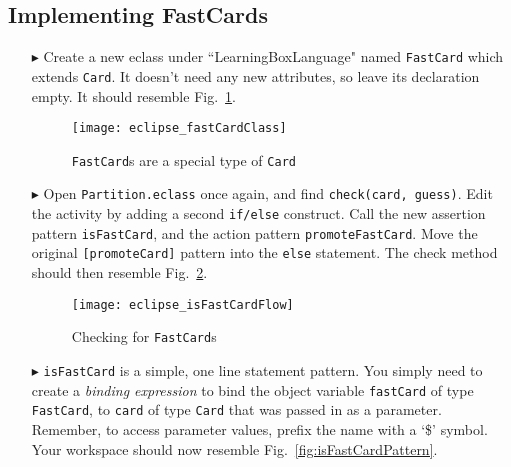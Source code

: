 \newpage
\subsection{Implementing FastCards}
\texHeader
\hypertarget{fastCard tex}{}

\begin{itemize}
  
\item[$\blacktriangleright$] Create a new eclass under ``LearningBoxLanguage" named
\texttt{FastCard} which extends \texttt{Card}. It doesn't need any new attributes, so leave its declaration empty. It should resemble Fig.~\ref{fig:fastClass}.

\vspace{0.5cm}

\begin{figure}[htp]
\begin{center}
  \texttt{[image: eclipse\_fastCardClass]}
  \caption{\texttt{FastCard}s are a special type of \texttt{Card}}
  \label{fig:fastClass}
\end{center}
\end{figure}

\item[$\blacktriangleright$] Open \texttt{Partition.eclass} once again, and find \texttt{check(card, guess)}. Edit the activity by adding a second
\texttt{if/else} construct. Call the new assertion pattern \texttt{isFastCard}, and the action pattern \texttt{promoteFastCard}. Move the original
\texttt{[promoteCard]} pattern into the \texttt{else} statement. The check method should then resemble Fig.~\ref{fig:isFastCard}.

\vspace{0.5cm}

\begin{figure}[htp]
\begin{center}
  \texttt{[image: eclipse\_isFastCardFlow]}
  \caption{Checking for \texttt{FastCard}s}
  \label{fig:isFastCard}
\end{center}
\end{figure}

\item[$\blacktriangleright$] \texttt{isFastCard} is a simple, one line statement pattern. You simply need to create a \emph{binding expression} to bind the
object variable \texttt{fastCard} of type \texttt{FastCard}, to \texttt{card} of type \texttt{Card} that was passed in as a parameter. Remember, to access
parameter values, prefix the name with a `\$' symbol. Your workspace should now resemble Fig.~\ref{fig:isFastCardPattern}.


\end{itemize}
